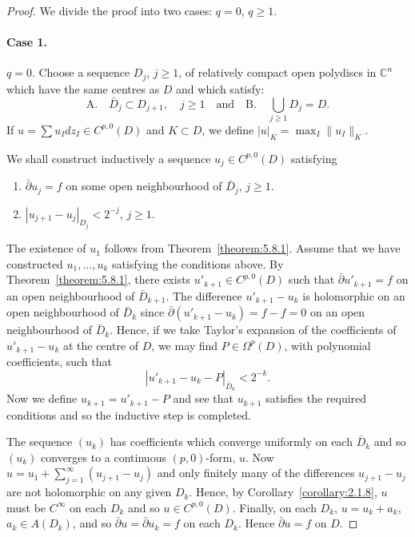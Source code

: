 \begin{proof}
We divide the proof into two cases: $q=0$, $q\geq1$.
\paragraph{Case 1.} $q=0$. Choose a sequence $D_j$, $j\geq1$, of relatively compact open polydiscs in $\mathbb C^n$ which have the same centres as $D$ and which satisfy:
\[\text{A.}\quad\bar D_j\subset D_{j+1},\quad j\geq1\quad\text{and}\quad\text{B.}\quad\bigcup_{j\geq1}D_j=D.\]
If $u=\sum u_Idz_I\in C^{p,0}(D)$ and $K\subset D$, we define $|u|_K=\max_I\|u_I\|_K$.

We shall construct inductively a sequence $u_j\in C^{p,0}(D)$ satisfying
\begin{enumerate}
\item $\bar\partial u_j=f$ on some open neighbourhood of $\bar D_j$, $j\geq1$.
\item $|u_{j+1}-u_j|_{D_j}<2^{-j}$, $j\geq1$.
\end{enumerate}
The existence of $u_1$ follows from Theorem~\ref{theorem:5.8.1}. Assume that we have constructed $u_1,\ldots,u_k$ satisfying the conditions above. By Theorem~\ref{theorem:5.8.1}, there exists $u'_{k+1}\in C^{p,0}(D)$ such that $\bar\partial u'_{k+1}=f$ on an open neighbourhood of $\bar D_{k+1}$. The difference $u'_{k+1}-u_k$ is holomorphic on an open neighbourhood of $\bar D_k$ since $\bar\partial(u'_{k+1}-u_k)=f-f=0$ on an open neighbourhood of $\bar D_k$. Hence, if we take Taylor's expansion of the coefficients of $u'_{k+1}-u_k$ at the centre of $D$, we may find $P\in\Omega^p(D)$, with polynomial coefficients, such that
\[|u'_{k+1}-u_k-P|_{\bar D_k}<2^{-k}.\]
Now we define $u_{k+1}=u'_{k+1}-P$ and see that $u_{k+1}$ satisfies the required conditions and so the inductive step is completed.

The sequence $(u_k)$ has coefficients which converge uniformly on each $\bar D_k$ and so $(u_k)$ converges to a continuous $(p,0)$-form, $u$. Now $u=u_1+\sum_{j=1}^\infty(u_{j+1}-u_j)$ and only finitely many of the differences $u_{j+1}-u_j$ are not holomorphic on any given $D_k$. Hence, by Corollary~\ref{corollary:2.1.8}, $u$ must be $C^\infty$ on each $D_k$ and so $u\in C^{p,0}(D)$. Finally, on each $D_k$, $u=u_k+a_k$, $a_k\in A(D_k)$, and so $\bar\partial u=\bar\partial u_k=f$ on each $D_k$. Hence $\bar\partial u=f$ on $D$.

\end{proof}
